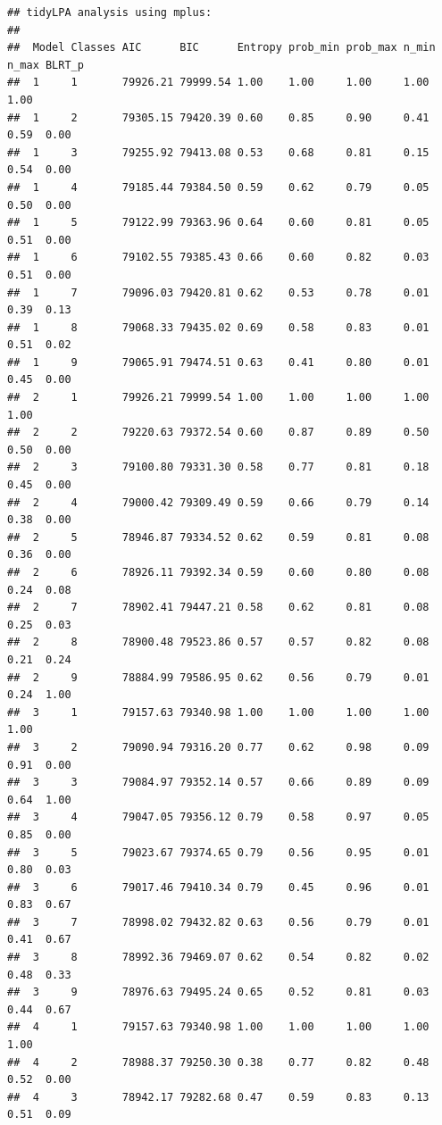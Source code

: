 \documentclass[
  english,
  man]{apa6}
\begin{document}
\begin{verbatim}
## tidyLPA analysis using mplus: 
## 
##  Model Classes AIC      BIC      Entropy prob_min prob_max n_min n_max BLRT_p
##  1     1       79926.21 79999.54 1.00    1.00     1.00     1.00  1.00        
##  1     2       79305.15 79420.39 0.60    0.85     0.90     0.41  0.59  0.00  
##  1     3       79255.92 79413.08 0.53    0.68     0.81     0.15  0.54  0.00  
##  1     4       79185.44 79384.50 0.59    0.62     0.79     0.05  0.50  0.00  
##  1     5       79122.99 79363.96 0.64    0.60     0.81     0.05  0.51  0.00  
##  1     6       79102.55 79385.43 0.66    0.60     0.82     0.03  0.51  0.00  
##  1     7       79096.03 79420.81 0.62    0.53     0.78     0.01  0.39  0.13  
##  1     8       79068.33 79435.02 0.69    0.58     0.83     0.01  0.51  0.02  
##  1     9       79065.91 79474.51 0.63    0.41     0.80     0.01  0.45  0.00  
##  2     1       79926.21 79999.54 1.00    1.00     1.00     1.00  1.00        
##  2     2       79220.63 79372.54 0.60    0.87     0.89     0.50  0.50  0.00  
##  2     3       79100.80 79331.30 0.58    0.77     0.81     0.18  0.45  0.00  
##  2     4       79000.42 79309.49 0.59    0.66     0.79     0.14  0.38  0.00  
##  2     5       78946.87 79334.52 0.62    0.59     0.81     0.08  0.36  0.00  
##  2     6       78926.11 79392.34 0.59    0.60     0.80     0.08  0.24  0.08  
##  2     7       78902.41 79447.21 0.58    0.62     0.81     0.08  0.25  0.03  
##  2     8       78900.48 79523.86 0.57    0.57     0.82     0.08  0.21  0.24  
##  2     9       78884.99 79586.95 0.62    0.56     0.79     0.01  0.24  1.00  
##  3     1       79157.63 79340.98 1.00    1.00     1.00     1.00  1.00        
##  3     2       79090.94 79316.20 0.77    0.62     0.98     0.09  0.91  0.00  
##  3     3       79084.97 79352.14 0.57    0.66     0.89     0.09  0.64  1.00  
##  3     4       79047.05 79356.12 0.79    0.58     0.97     0.05  0.85  0.00  
##  3     5       79023.67 79374.65 0.79    0.56     0.95     0.01  0.80  0.03  
##  3     6       79017.46 79410.34 0.79    0.45     0.96     0.01  0.83  0.67  
##  3     7       78998.02 79432.82 0.63    0.56     0.79     0.01  0.41  0.67  
##  3     8       78992.36 79469.07 0.62    0.54     0.82     0.02  0.48  0.33  
##  3     9       78976.63 79495.24 0.65    0.52     0.81     0.03  0.44  0.67  
##  4     1       79157.63 79340.98 1.00    1.00     1.00     1.00  1.00        
##  4     2       78988.37 79250.30 0.38    0.77     0.82     0.48  0.52  0.00  
##  4     3       78942.17 79282.68 0.47    0.59     0.83     0.13  0.51  0.09  

\end{verbatim}
\end{document}
